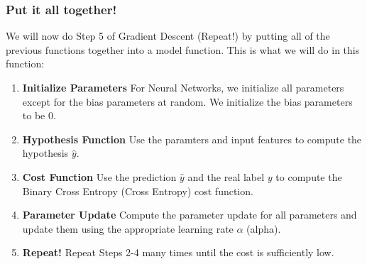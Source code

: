 \documentclass{article}
\begin{document}
\subsubsection{Put it all together!}
We will now do Step 5 of Gradient Descent (Repeat!) by putting all of the previous functions together into a model function. This is what we will do in this function:
\begin{enumerate}
    \item \textbf{Initialize Parameters}
    For Neural Networks, we initialize all parameters except for the bias parameters at random. We initialize the bias parameters to be 0.
    \item \textbf{Hypothesis Function}
    Use the paramters and input features to compute the hypothesis $\hat{y}$. 
    \item \textbf{Cost Function}
    Use the prediction $\hat{y}$ and the real label $y$ to compute the Binary Cross Entropy (Cross Entropy) cost function.
    \item \textbf{Parameter Update}
    Compute the parameter update for all parameters and update them using the appropriate learning rate $\alpha$ (alpha).
    \item \textbf{Repeat!}
    Repeat Steps 2-4 many times until the cost is sufficiently low.
\end{enumerate}
\end{document}
